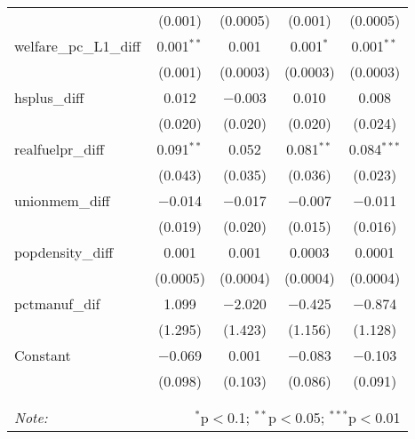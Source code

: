 \begin{table}[!htbp]
\begin{tabular}{@{\extracolsep{5pt}}lcccc}
  & (0.001) & (0.0005) & (0.001) & (0.0005) \\ 
  welfare\_pc\_L1\_diff & 0.001$^{**}$ & 0.001 & 0.001$^{*}$ & 0.001$^{**}$ \\ 
  & (0.001) & (0.0003) & (0.0003) & (0.0003) \\ 
  hsplus\_diff & 0.012 & $-$0.003 & 0.010 & 0.008 \\ 
  & (0.020) & (0.020) & (0.020) & (0.024) \\ 
  realfuelpr\_diff & 0.091$^{**}$ & 0.052 & 0.081$^{**}$ & 0.084$^{***}$ \\ 
  & (0.043) & (0.035) & (0.036) & (0.023) \\ 
  unionmem\_diff & $-$0.014 & $-$0.017 & $-$0.007 & $-$0.011 \\ 
  & (0.019) & (0.020) & (0.015) & (0.016) \\ 
  popdensity\_diff & 0.001 & 0.001 & 0.0003 & 0.0001 \\ 
  & (0.0005) & (0.0004) & (0.0004) & (0.0004) \\ 
  pctmanuf\_dif & 1.099 & $-$2.020 & $-$0.425 & $-$0.874 \\ 
  & (1.295) & (1.423) & (1.156) & (1.128) \\ 
  Constant & $-$0.069 & 0.001 & $-$0.083 & $-$0.103 \\ 
  & (0.098) & (0.103) & (0.086) & (0.091) \\ 
 \hline \\[-1.8ex] 
\hline 
\hline \\[-1.8ex] 
\textit{Note:}  & \multicolumn{4}{r}{$^{*}$p$<$0.1; $^{**}$p$<$0.05; $^{***}$p$<$0.01} \\ 
\end{tabular} 
\end{table} 
